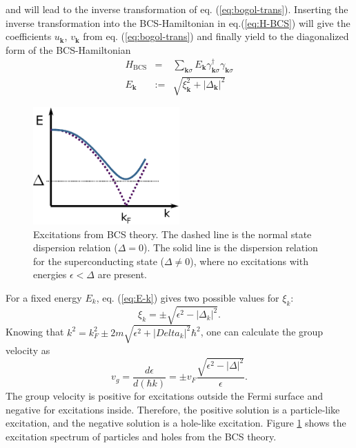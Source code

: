 and will lead to the inverse transformation of eq. (\ref{eq:bogol-trans}). Inserting the inverse transformation into the BCS-Hamiltonian in eq.(\ref{eq:H-BCS}) will give the coefficients $u_{\mathbf{k}}$, $v_{\mathbf{k}}$ from eq. (\ref{eq:bogol-trans}) and finally yield to the diagonalized form of the BCS-Hamiltonian
\begin{eqnarray}
H_{\text{BCS}} &=&  \sum_{ \mathbf{k} \sigma } E_{ \mathbf{k} } \gamma^{\dagger}_{\mathbf{k} \sigma } \gamma_{\mathbf{k} \sigma }\\
E_{\mathbf{k}} &:=&  \sqrt{\xi^2_{\mathbf{k}}  + |\Delta_{\mathbf{k}}|^2 } \label{eq:E-k}
\end{eqnarray}
\begin{figure}
\centering
\includegraphics[width=0.5\textwidth]{figure/framework-analytical/bcs-spectrum}
\caption{Excitations from BCS theory. The dashed line is the normal state dispersion relation ($\Delta = 0$). The solid line is the dispersion relation for the superconducting state ($\Delta \neq 0$), where no excitations with energies $\epsilon < \Delta$ are present. } \label{fig:bcs-spectrum}
\end{figure}
For a fixed energy $E_k$, eq. (\ref{eq:E-k}) gives two possible values for $\xi_k$:
\begin{equation}
\xi_k = \pm \sqrt{\epsilon^2 - | \Delta_k|^2}.
\end{equation}
Knowing that $k^2 = k_F^2 \pm 2m\sqrt{\epsilon^2 + |Delta_k|^2} \hbar^2$, one can calculate the group velocity as 
\begin{equation}
v_g = \frac{d \epsilon}{d (\hbar k)} = \pm v_F \frac{\sqrt{\epsilon^2 - |\Delta|^2}}{\epsilon}.
\end{equation}
The group velocity is positive for excitations outside the Fermi surface and negative for excitations inside. Therefore, the positive solution is a particle-like excitation, and the negative solution is a hole-like excitation. Figure \ref{fig:bcs-spectrum} shows the excitation spectrum of particles and holes from the BCS theory. 

